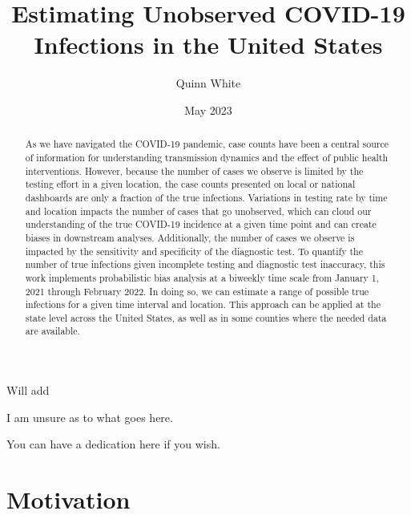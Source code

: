 \documentclass[12pt,twoside]{smiththesis}
\title{Estimating Unobserved COVID-19 Infections in the United States}
\author{Quinn White}
\date{May 2023}
\newenvironment{Shaded}{\begin{snugshade}}{\end{snugshade}}
\newcommand{\AttributeTok}[1]{\textcolor[rgb]{0.77,0.63,0.00}{#1}}
\newcommand{\ConstantTok}[1]{\textcolor[rgb]{0.00,0.00,0.00}{#1}}
\newcommand{\DecValTok}[1]{\textcolor[rgb]{0.00,0.00,0.81}{#1}}
\newcommand{\FunctionTok}[1]{\textcolor[rgb]{0.00,0.00,0.00}{#1}}
\newcommand{\NormalTok}[1]{#1}
\newcommand{\SpecialCharTok}[1]{\textcolor[rgb]{0.00,0.00,0.00}{#1}}
\begin{document}
  \maketitle

\frontmatter %
\pagestyle{empty} %
  \begin{acknowledgements}
    Will add
  \end{acknowledgements}
  \begin{preface}
    I am unsure as to what goes here.
  \end{preface}
  \hypersetup{linkcolor=black}
  \setcounter{tocdepth}{2}
  \tableofcontents

  \listoftables

  \listoffigures
  \begin{abstract}
    As we have navigated the COVID-19 pandemic, case counts have been a central source of information for understanding transmission dynamics and the effect of public health interventions. However, because the number of cases we observe is limited by the testing effort in a given location, the case counts presented on local or national dashboards are only a fraction of the true infections. Variations in testing rate by time and location impacts the number of cases that go unobserved, which can cloud our understanding of the true COVID-19 incidence at a given time point and can create biases in downstream analyses. Additionally, the number of cases we observe is impacted by the sensitivity and specificity of the diagnostic test. To quantify the number of true infections given incomplete testing and diagnostic test inaccuracy, this work implements probabilistic bias analysis at a biweekly time scale from January 1, 2021 through February 2022. In doing so, we can estimate a range of possible true infections for a given time interval and location. This approach can be applied at the state level across the United States, as well as in some counties where the needed data are available.
  \end{abstract}
  \begin{dedication}
    You can have a dedication here if you wish.
  \end{dedication}
\mainmatter %
\pagestyle{fancyplain} %
\begin{Shaded}
\end{Shaded}
\hypertarget{motivation}{%
\chapter{Motivation}\label{motivation}}
\end{document}
